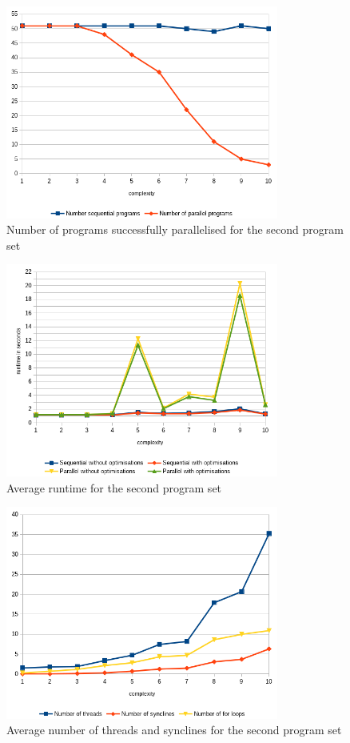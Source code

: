 \begin{figure}
    \centering
    \includegraphics[width=0.8\textwidth]{img/generated/par-success-2.png}
    \caption{\label{fig:gen-par-success-2}Number of programs successfully parallelised for the second program set}
\end{figure}
\begin{figure}
    \centering
    \includegraphics[width=0.8\textwidth]{img/generated/avg-runtime-2.png}
    \caption{\label{fig:gen-avg-runtime-2}Average runtime for the second program set}
\end{figure}
\begin{figure}
    \centering
    \includegraphics[width=0.8\textwidth]{img/generated/thread-count-2.png}
    \caption{\label{fig:gen-thread-count-2}Average number of threads and synclines for the second program set}
\end{figure}

